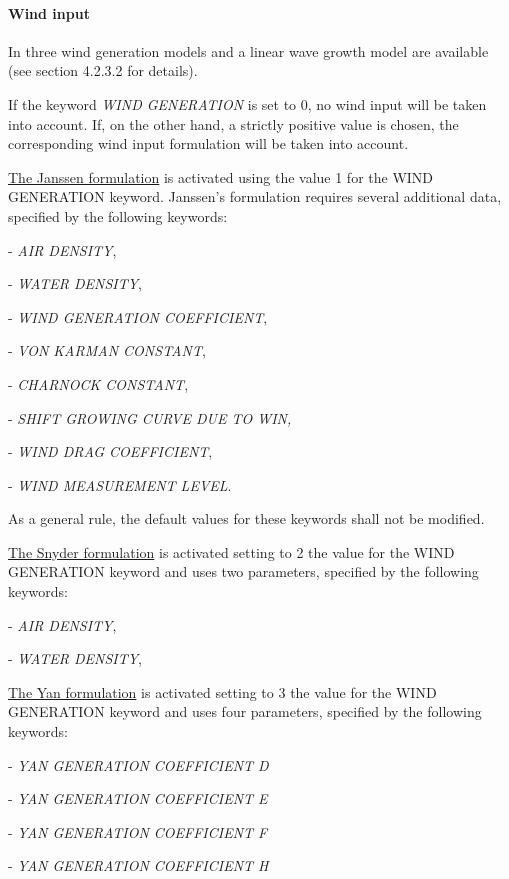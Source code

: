\paragraph{ Wind input}

 In \tomawac three wind generation models and a linear wave growth model are available (see section 4.2.3.2 for details).

 If the keyword \textit{WIND GENERATION} is set to 0, no wind input will be taken into account. If, on the other hand, a strictly positive value is chosen, the corresponding wind input formulation will be taken into account.

 \underline{ The Janssen formulation} is activated using the value 1 for the WIND GENERATION keyword. Janssen's formulation requires several additional data, specified by the following keywords:
 
- \textit{AIR DENSITY},

- \textit{WATER DENSITY},  

- \textit{WIND GENERATION COEFFICIENT}, 

- \textit{VON KARMAN CONSTANT}, 

- \textit{CHARNOCK CONSTANT},   

- \textit{SHIFT GROWING CURVE DUE TO WIN,} 

- \textit{WIND DRAG COEFFICIENT},  

- \textit{WIND MEASUREMENT LEVEL}.  

  \textit{}

As a general rule, the default values for these keywords shall not be modified.

 \underline{ The Snyder formulation} is activated setting to 2 the value for the WIND GENERATION keyword and uses two parameters, specified by the following keywords:   

- \textit{AIR DENSITY},   

- \textit{WATER DENSITY},

   \textit{}

\underline{ The Yan formulation} is activated setting to 3 the value for the WIND GENERATION keyword and uses four parameters, specified by the following keywords:   

- \textit{YAN GENERATION COEFFICIENT D}  

- \textit{YAN GENERATION COEFFICIENT E} 

- \textit{YAN GENERATION COEFFICIENT F} 

- \textit{YAN GENERATION COEFFICIENT H}

